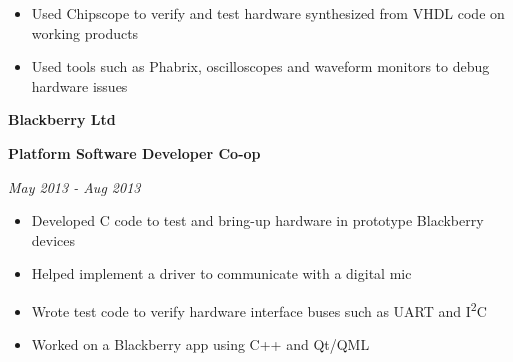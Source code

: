 \documentclass{article}
\newenvironment{name}{\fontfamily{phv}\selectfont\bfseries\normalsize}{\par}
\newenvironment{colorheading}{\fontfamily{phv}\selectfont\bfseries\normalsize\color{darkcyan}}{\par}
\newenvironment{metadata}{\fontfamily{phv}\selectfont\itshape\small\color{darkgray}}{\par}
\newenvironment{itemizedbody}{\fontfamily{phv}\selectfont\small\begin{itemize}}{\end{itemize}\par}
\newenvironment{experience}[2]%
{%
  \begin{minipage}{0.6\linewidth}\begin{flushleft}#1\end{flushleft}\end{minipage}%
  \hfill%
  \begin{minipage}{0.3\linewidth}\begin{flushright}#2\end{flushright}\end{minipage}%
}%
{}
\newcommand{\lineitem}{\item[{$\to$}]}
\begin{document}
\begin{minipage}[t]{0.6\linewidth}
\begin{itemizedbody}
      \lineitem Used Chipscope to verify and test hardware synthesized from VHDL code on working products
      \lineitem Used tools such as Phabrix, oscilloscopes and waveform monitors to debug hardware issues
    \end{itemizedbody}
    \smallskip
    \begin{experience}
    {
      \begin{name}Blackberry Ltd\end{name}
      \begin{colorheading}Platform Software Developer Co-op\end{colorheading}
    }
    {
      \begin{metadata}May 2013 - Aug 2013\end{metadata}
    }
    \end{experience}
    \begin{itemizedbody}
      \lineitem Developed C code to test and bring-up hardware in prototype Blackberry devices
      \lineitem Helped implement a driver to communicate with a digital mic
      \lineitem Wrote test code to verify hardware interface buses such as UART and I\textsuperscript{2}C
      \lineitem Worked on a Blackberry app using C++ and Qt/QML
    \end{itemizedbody}

\end{minipage}
\end{document}
